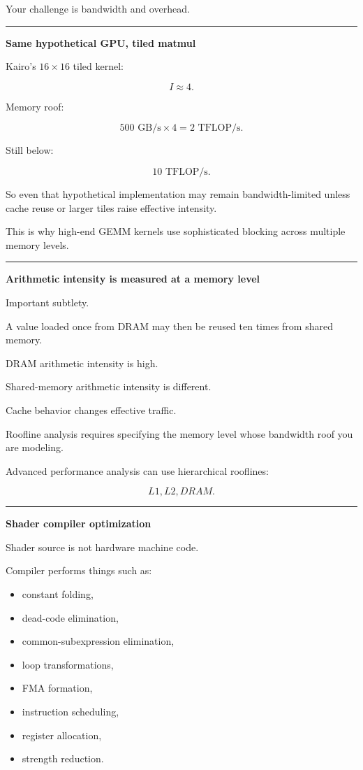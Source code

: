 Your challenge is bandwidth and overhead.

\begin{center}\rule{0.5\linewidth}{0.5pt}\end{center}

\textbf{Same hypothetical GPU, tiled matmul}

Kairo's \(16\times16\) tiled kernel:

\[
I\approx4.
\]

Memory roof:

\[
500\text{ GB/s}
\times
4
=
2\text{ TFLOP/s}.
\]

Still below:

\[
10\text{ TFLOP/s}.
\]

So even that hypothetical implementation may remain bandwidth-limited unless cache reuse or larger tiles raise effective intensity.

This is why high-end GEMM kernels use sophisticated blocking across multiple memory levels.

\begin{center}\rule{0.5\linewidth}{0.5pt}\end{center}

\textbf{Arithmetic intensity is measured at a memory level}

Important subtlety.

A value loaded once from DRAM may then be reused ten times from shared memory.

DRAM arithmetic intensity is high.

Shared-memory arithmetic intensity is different.

Cache behavior changes effective traffic.

Roofline analysis requires specifying the memory level whose bandwidth roof you are modeling.

Advanced performance analysis can use hierarchical rooflines:

\[
L1,
L2,
DRAM.
\]

\begin{center}\rule{0.5\linewidth}{0.5pt}\end{center}

\textbf{Shader compiler optimization}

Shader source is not hardware machine code.

Compiler performs things such as:

\begin{itemize}
\tightlist
\item
  constant folding,
\item
  dead-code elimination,
\item
  common-subexpression elimination,
\item
  loop transformations,
\item
  FMA formation,
\item
  instruction scheduling,
\item
  register allocation,
\item
  strength reduction.
\end{itemize}

